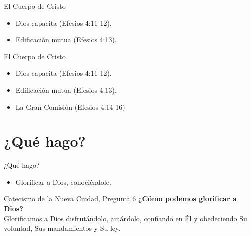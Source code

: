 \documentclass[17pt, aspectratio=169]{beamer}
\begin{document}
\begin{frame}{El Cuerpo de Cristo}
    \begin{itemize}
        \item Dios capacita (Efesios 4:11-12).
        \item Edificaci\'on mutua (Efesios 4:13).
    \end{itemize}
\end{frame}

\begin{frame}{El Cuerpo de Cristo}
    \begin{itemize}
        \item Dios capacita (Efesios 4:11-12).
        \item Edificaci\'on mutua (Efesios 4:13).
        \item La Gran Comisi\'on (Efesios 4:14-16)
    \end{itemize}
\end{frame}

\section{¿Qué hago?}
\begin{frame}{¿Qué hago?}
    \begin{itemize}
        \item Glorificar a Dios, conoci\'endole.
    \end{itemize}
        \begin{citaBiblicaSlide}{Catecismo de la Nueva Ciudad, Pregunta 6}
        \textbf{¿Cómo podemos glorificar a Dios?}\\
Glorificamos a Dios disfrutándolo, amándolo, confiando en Él y obedeciendo Su voluntad, Sus mandamientos y Su ley.
    \end{citaBiblicaSlide}
\end{frame}

    
    
\end{document}

